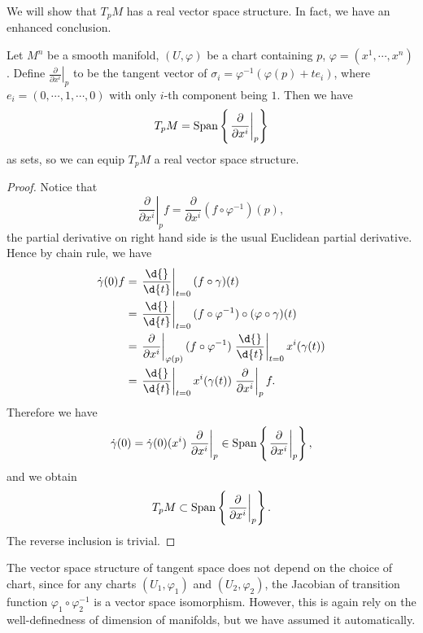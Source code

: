 We will show that $T_pM$ has a real vector space structure.
In fact, we have an enhanced conclusion.
\begin{prop}\label{local tangent vector}
    Let $M^n$ be a smooth manifold, $(U,\varphi)$ be a chart containing $p$, $\varphi=(x^1,\cdots,x^n)$.
    Define $\left.\frac{\partial}{\partial{x^i}}\right|_p$ to be the tangent vector of $\sigma_i=\varphi^{-1}(\varphi(p)+te_i)$, where $e_i=(0,\cdots,1,\cdots,0)$ with only $i$-th component being $1$.
    Then we have
    \[T_pM=\operatorname{Span}\left\{\left.\frac{\partial{}}{\partial{x^i}}\right|_p\right\}\]
    as sets, so we can equip $T_pM$ a real vector space structure.
\end{prop}
\begin{proof}
    Notice that
    \[\left.\frac{\partial{}}{\partial{x^i}}\right|_pf=\frac{\partial}{\partial{x^i}}(f\circ\varphi^{-1})(p),\]
    the partial derivative on right hand side is the usual Euclidean partial derivative.
    Hence by chain rule, we have
    \begin{align*}
        \dot\gamma(0)f&=\left.\frac{\d{}}{\d{t}}\right|_{t=0}(f\circ\gamma)(t)\\
        &=\left.\frac{\d{}}{\d{t}}\right|_{t=0}(f\circ\varphi^{-1})\circ(\varphi\circ\gamma)(t)\\
        &=\left.\frac{\partial{}}{\partial{x^i}}\right|_{\varphi(p)}(f\circ\varphi^{-1})\left.\frac{\d{}}{\d{t}}\right|_{t=0}x^i(\gamma(t))\\
        &=\left.\frac{\d{}}{\d{t}}\right|_{t=0}x^i(\gamma(t))\left.\frac{\partial{}}{\partial{x^i}}\right|_pf.
    \end{align*}
    Therefore we have
    \[\dot\gamma(0)=\dot\gamma(0)(x^i)\left.\frac{\partial{}}{\partial{x^i}}\right|_p\in\operatorname{Span}\left\{\left.\frac{\partial{}}{\partial{x^i}}\right|_p\right\},\]
    and we obtain
    \[T_pM\subset\operatorname{Span}\left\{\left.\frac{\partial{}}{\partial{x^i}}\right|_p\right\}.\]
    The reverse inclusion is trivial.
\end{proof}

\begin{rem}
    The vector space structure of tangent space does not depend on the choice of chart, since for any charts $(U_1,\varphi_1)$ and $(U_2,\varphi_2)$, the Jacobian of transition function $\varphi_1\circ\varphi_2^{-1}$ is a vector space isomorphism.
    However, this is again rely on the well-definedness of dimension of manifolds, but we have assumed it automatically.
\end{rem}


